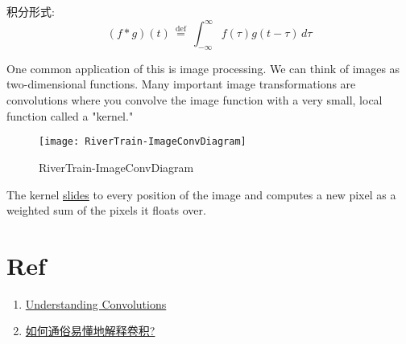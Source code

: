 积分形式:
$$ (f*g)(t)\,{\stackrel {\mathrm {def} }{=}}\ \int _{-\infty }^{\infty }f(\tau )g(t-\tau )\,d\tau $$

One common application of this is image processing. We can think of images as two-dimensional functions.
Many important image transformations are convolutions where you convolve the image function with a very small, local function called a "kernel."

\begin{figure}[htbp]
  \centering
  \texttt{[image: RiverTrain-ImageConvDiagram]}\\
  \caption{RiverTrain-ImageConvDiagram}\label{fig.convolution.RiverTrain-ImageConvDiagram}
\end{figure}

The kernel \href{https://imgbox.com/CIAvIk7p}{slides} to every position of the image
and computes a new pixel as a weighted sum of the pixels it floats over.

\section*{Ref}
\begin{enumerate}
\item \href{http://colah.github.io/posts/2014-07-Understanding-Convolutions/}{Understanding Convolutions}
\item \href{https://www.zhihu.com/question/22298352}{如何通俗易懂地解释卷积?}
\end{enumerate}

